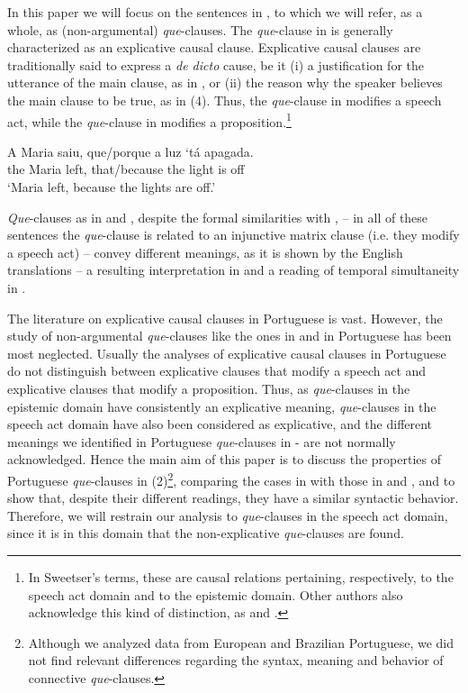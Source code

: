 \documentclass[output=paper,colorlinks,citecolor=brown,
]{langscibook}
\begin{document}
In this paper we will focus on the sentences in , to which we will refer, as a whole, as (non-argumental) \textit{que}-clauses.
The \textit{que}-clause in  is generally characterized as an explicative causal clause. Explicative causal clauses are traditionally said to express a \textit{de dicto} cause, be it (i) a justification for the utterance of the main clause, as in , or (ii) the reason why the speaker believes the main clause to be true, as in (4). Thus, the \textit{que}-clause in  modifies a speech act, while the \textit{que}-clause in  modifies a proposition.\footnote{In Sweetser's \citeyearpar{sweetser_etymology_1990} terms, these are causal relations pertaining, respectively, to the speech act domain and to the epistemic domain. Other authors also acknowledge this kind of distinction, as \citet{peres_notes_2005} and \citet{frey_correlations_2016}.}

\ea \label{ex:matos:maria-saiu}
\gll A Maria saiu, que/porque a luz ‘tá apagada.\\
     the Maria left, that/because the light is off\\
\glt ‘Maria left, because the lights are off.’ 
\z

\textit{Que}-clauses as in  and , despite the formal similarities with , – in all of these sentences the \textit{que}-clause is related to an injunctive matrix clause (i.e. they modify a speech act) – convey different meanings, as it is shown by the English translations – a resulting interpretation in  and a reading of temporal simultaneity in .

The literature on explicative causal clauses in Portuguese is vast. However, the study of non-argumental \textit{que}-clauses like the ones in  and  in Portuguese has been most neglected. Usually the analyses of explicative causal clauses in Portuguese do not distinguish between explicative clauses that modify a speech act and explicative clauses that modify a proposition. Thus, as \textit{que}-clauses in the epistemic domain have consistently an explicative meaning, \textit{que}-clauses in the speech act domain have also been considered as explicative, and the different meanings we identified in Portuguese \textit{que}-clauses in - are not normally acknowledged. Hence the main aim of this paper is to discuss the properties of Portuguese \textit{que}-clauses in (2)\footnote{Although we analyzed data from European and Brazilian Portuguese, we did not find relevant differences regarding the syntax, meaning and behavior of connective \textit{que}-clauses.}, comparing the cases in  with those in  and , and to show that, despite their different readings, they have a similar syntactic behavior. Therefore, we will restrain our analysis to \textit{que}-clauses in the speech act domain, since it is in this domain that the non-explicative \textit{que}-clauses are found.
\end{document}
